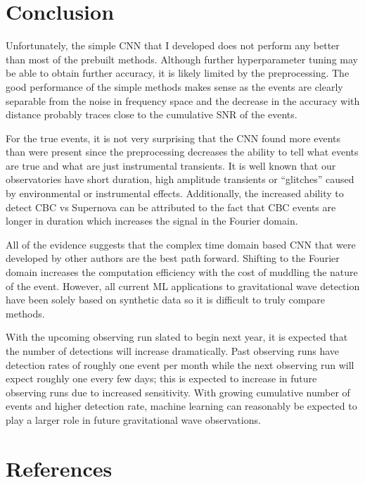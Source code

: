 \documentclass{article}
\begin{document}
\section{Conclusion}

Unfortunately, the simple CNN that I developed does not perform any better than most of the prebuilt methods. Although further hyperparameter tuning may be able to obtain further accuracy, it is likely limited by the preprocessing. The good performance of the simple methods makes sense as the events are clearly separable from the noise in frequency space and the decrease in the accuracy with distance probably traces close to the cumulative SNR of the events. 

For the true events, it is not very surprising that the CNN found more events than were present since the preprocessing decreases the ability to tell what events are true and what are just instrumental transients. It is well known that our observatories have short duration, high amplitude transients or ``glitches'' caused by environmental or instrumental effects. Additionally, the increased ability to detect CBC vs Supernova can be attributed to the fact that CBC events are longer in duration which increases the signal in the Fourier domain.

All of the evidence suggests that the complex time domain based CNN that were developed by other authors are the best path forward. Shifting to the Fourier domain increases the computation efficiency with the cost of muddling the nature of the event.  However, all current ML applications to gravitational wave detection have been solely based on synthetic data so it is difficult to truly compare methods. 

With the upcoming observing run slated to begin next year, it is expected that the number of detections will increase dramatically. Past observing runs have detection rates of roughly one event per month while the next observing run will expect roughly one every few days; this is expected to increase in future observing runs due to increased sensitivity. With growing cumulative number of events and higher detection rate, machine learning can reasonably be expected to play a larger role in future gravitational wave observations.

\section*{References}
\medskip

\small
\end{document}
